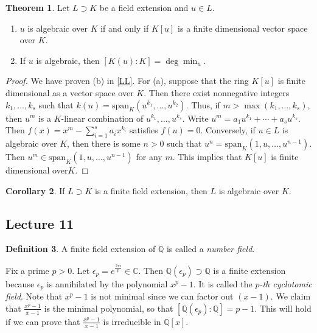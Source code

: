 \documentclass[10pt,letterpaper,cm]{nupset}
\theoremstyle{definition}
\newtheorem{definition}{Definition}[subsection]
\theoremstyle{theorem}
\newtheorem{theorem}[definition]{Theorem}
\newtheorem{corollary}[definition]{Corollary}
\theoremstyle{remark}
\newcommand{\C}{\mathbb C}
\newcommand{\Q}{\mathbb Q}
\newcommand{\1}{\mathbf{1}}
\newcommand{\0}{\vec 0}
\begin{document}
\begin{theorem}
Let $L \supset K$ be a field extension and $u\in L$.
\begin{enumerate}[label=(\alph*)]
\item $u$ is algebraic over $K$ if and only if $K[u]$ is a finite dimensional vector space over $K$.
\item If $u$ is algebraic, then $[K(u) : K] = \deg{\min_u}$. 
\end{enumerate}
\end{theorem}
\begin{proof}
We have proven (b) in \cref{LL}. For (a), suppose that the ring $K[u]$ is finite dimensional as a vector space over $K$. Then there exist nonnegative integers $k_1, \ldots, k_s$ such that $k(u) = \text{span}_K(u^{k_1}, \ldots, u^{k_2})$. Thus, if $m > \max(k_1, \ldots, k_s)$, then $u^m$ is a $K$-linear combination of $u^{k_1}, \ldots, u^{k_s}$. Write $u^m = a_1u^{k_1} + \cdots + a_s u^{k_s}$. Then $f(x) = x^m - \sum_{i=1}^s a_i x^{k_i}$ satisfies  $f(u) = 0$. Conversely, if $u\in L$ is algebraic over $K$, then there is some $n>0$ such that $u^n = \text{span}_K(1, u, \ldots, u^{n-1})$. Then $u^m \in \text{span}_K(1, u, \ldots, u^{n-1})$ for any $m$. This implies that $K[u]$ is finite dimensional over$K$.
\end{proof}

\begin{corollary}
If $L\supset K$ is a finite field extension, then $L$ is algebraic over $K$.
\end{corollary}

\subsection{Lecture 11}

\begin{definition}
A finite field extension of $\Q$ is called a \textit{number field}.
\end{definition}

\smallskip

 Fix a prime $p>0$. Let $\epsilon_p = e^{\frac{2\pi i}{p}} \in \C$. Then $\Q(\epsilon_p) \supset \Q$ is a finite extension because $\epsilon_p$ is annihilated by the polynomial $x^p-1$. It is called the \textit{$p$-th cyclotomic field}. Note that $x^p-1$ is not minimal since we can factor out $\left(x-1\right)$. We claim that $\frac{x^p-1}{x-1}$ is the minimal polynomial, so that $\left[\Q(\epsilon_p) : \Q\right] =p-1$. This will hold if we can prove that $\frac{x^p-1}{x-1}$ is irreducible in $\Q[x]$.
 
\end{document}
